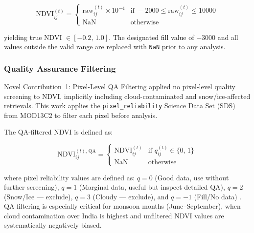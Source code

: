 \documentclass[12pt, a4paper]{article}
\begin{document}
\begin{equation}
    \text{NDVI}_{ij}^{(t)} =
    \begin{cases}
        \text{raw}_{ij}^{(t)} \times 10^{-4} &
            \text{if } -2000 \leq \text{raw}_{ij}^{(t)} \leq 10000 \\[4pt]
        \text{NaN} & \text{otherwise}
    \end{cases}
    \label{eq:ndvi_scale}
\end{equation}

yielding true NDVI $\in [-0.2,\, 1.0]$. The designated fill value of
$-3000$ and all values outside the valid range are replaced with
\texttt{NaN} prior to any analysis.

\subsubsection{Quality Assurance Filtering}
\label{sec:qa_filter}

\begin{novelbox}{Novel Contribution~1: Pixel-Level QA Filtering}
\citet{biswas2025} applied no pixel-level quality screening to NDVI,
implicitly including cloud-contaminated and snow/ice-affected retrievals.
This work applies the \texttt{pixel\_reliability} Science Data Set (SDS)
from MOD13C2 to filter each pixel before analysis.
\end{novelbox}

The QA-filtered NDVI is defined as:

\begin{equation}
    \text{NDVI}_{ij}^{(t),\,\text{QA}} =
    \begin{cases}
        \text{NDVI}_{ij}^{(t)} & \text{if } q_{ij}^{(t)} \in \{0,\, 1\} \\[4pt]
        \text{NaN}             & \text{otherwise}
    \end{cases}
    \label{eq:qa_filter}
\end{equation}

where pixel reliability values are defined as:
$q = 0$ (Good data, use without further screening),
$q = 1$ (Marginal data, useful but inspect detailed QA),
$q = 2$ (Snow/Ice — exclude),
$q = 3$ (Cloudy — exclude), and
$q = -1$ (Fill/No data) \citep{didan2021_ug}.
QA filtering is especially critical for monsoon months (June--September),
when cloud contamination over India is highest and unfiltered NDVI values
are systematically negatively biased.
\end{document}
